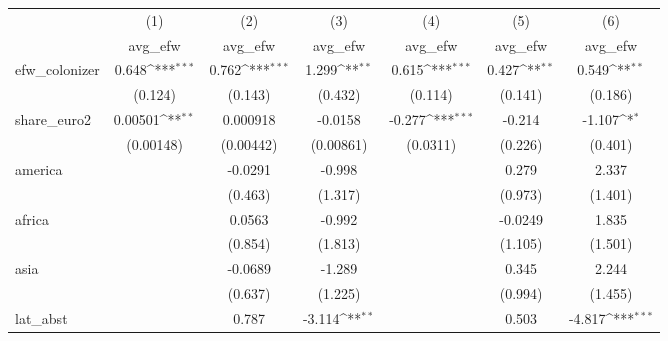 {
\def\sym#1{\ifmmode^{#1}\else\(^{#1}\)\fi}
\begin{tabular}{l*{6}{c}}
\hline\hline
            &\multicolumn{1}{c}{(1)}&\multicolumn{1}{c}{(2)}&\multicolumn{1}{c}{(3)}&\multicolumn{1}{c}{(4)}&\multicolumn{1}{c}{(5)}&\multicolumn{1}{c}{(6)}\\
            &\multicolumn{1}{c}{avg\_efw}&\multicolumn{1}{c}{avg\_efw}&\multicolumn{1}{c}{avg\_efw}&\multicolumn{1}{c}{avg\_efw}&\multicolumn{1}{c}{avg\_efw}&\multicolumn{1}{c}{avg\_efw}\\
\hline
efw\_colonizer&       0.648\sym{***}&       0.762\sym{***}&       1.299\sym{**} &       0.615\sym{***}&       0.427\sym{**} &       0.549\sym{**} \\
            &     (0.124)         &     (0.143)         &     (0.432)         &     (0.114)         &     (0.141)         &     (0.186)         \\
[1em]
share\_euro2 &     0.00501\sym{**} &    0.000918         &     -0.0158         &      -0.277\sym{***}&      -0.214         &      -1.107\sym{*}  \\
            &   (0.00148)         &   (0.00442)         &   (0.00861)         &    (0.0311)         &     (0.226)         &     (0.401)         \\
[1em]
america     &                     &     -0.0291         &      -0.998         &                     &       0.279         &       2.337         \\
            &                     &     (0.463)         &     (1.317)         &                     &     (0.973)         &     (1.401)         \\
[1em]
africa      &                     &      0.0563         &      -0.992         &                     &     -0.0249         &       1.835         \\
            &                     &     (0.854)         &     (1.813)         &                     &     (1.105)         &     (1.501)         \\
[1em]
asia        &                     &     -0.0689         &      -1.289         &                     &       0.345         &       2.244         \\
            &                     &     (0.637)         &     (1.225)         &                     &     (0.994)         &     (1.455)         \\
[1em]
lat\_abst    &                     &       0.787         &      -3.114\sym{**} &                     &       0.503         &      -4.817\sym{***}\\

\end{tabular}}
